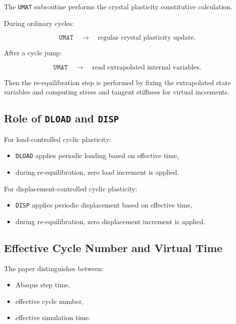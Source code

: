 ﻿\documentclass[11pt,a4paper]{article}
\begin{document}
The \texttt{UMAT} subroutine performs the crystal plasticity constitutive calculation.

During ordinary cycles:

\[
\texttt{UMAT}
\quad
\rightarrow
\quad
\text{regular crystal plasticity update}.
\]

After a cycle jump:

\[
\texttt{UMAT}
\quad
\rightarrow
\quad
\text{read extrapolated internal variables}.
\]

Then the re-equilibration step is performed by fixing the extrapolated state variables and computing stress and tangent stiffness for virtual increments.

\subsection{Role of \texttt{DLOAD} and \texttt{DISP}}

For load-controlled cyclic plasticity:

\begin{itemize}[leftmargin=*]
    \item \texttt{DLOAD} applies periodic loading based on effective time,
    \item during re-equilibration, zero load increment is applied.
\end{itemize}

For displacement-controlled cyclic plasticity:

\begin{itemize}[leftmargin=*]
    \item \texttt{DISP} applies periodic displacement based on effective time,
    \item during re-equilibration, zero displacement increment is applied.
\end{itemize}

\subsection{Effective Cycle Number and Virtual Time}

The paper distinguishes between:

\begin{itemize}[leftmargin=*]
    \item Abaqus step time,
    \item effective cycle number,
    \item effective simulation time.
\end{itemize}
\end{document}
